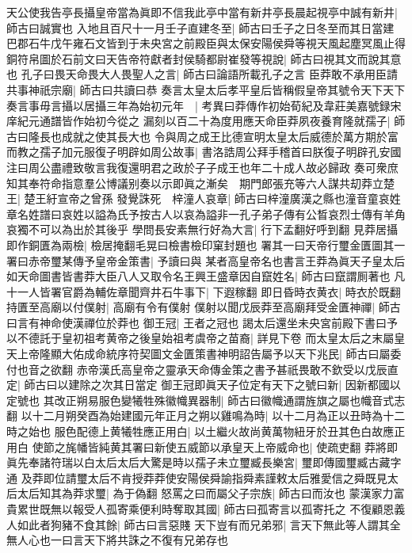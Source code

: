天公使我告亭長攝皇帝當為眞即不信我此亭中當有新井亭長晨起視亭中誠有新井|{
	師古曰誠實也}
入地且百尺十一月壬子直建冬至|{
	師古曰壬子之日冬至而其日當建}
巴郡石牛戊午雍石文皆到于未央宮之前殿臣與太保安陽侯舜等視天風起塵冥風止得銅符帛圖於石前文曰天告帝符獻者封侯騎都尉崔發等視說|{
	師古曰視其文而說其意也}
孔子曰畏天命畏大人畏聖人之言|{
	師古曰論語所載孔子之言}
臣莽敢不承用臣請共事神祇宗廟|{
	師古曰共讀曰恭}
奏言太皇太后孝平皇后皆稱假皇帝其號令天下天下奏言事毋言攝以居攝三年為始初元年　|{
	考異曰莽傳作初始荀紀及韋莊美嘉號録宋庠紀元通譜皆作始初今從之}
漏刻以百二十為度用應天命臣莽夙夜養育隆就孺子|{
	師古曰隆長也成就之使其長大也}
令與周之成王比德宣明太皇太后威德於萬方期於富而教之孺子加元服復子明辟如周公故事|{
	書洛誥周公拜手稽首曰朕復子明辟孔安國注曰周公盡禮致敬言我復還明君之政於子子成王也年二十成人故必歸政}
奏可衆庶知其奉符命指意羣公博議别奏以示即眞之漸矣　期門郎張充等六人謀共刧莽立楚王|{
	楚王紆宣帝之曾孫}
發覺誅死　梓潼人哀章|{
	師古曰梓潼廣漢之縣也潼音童哀姓章名姓譜曰哀姓以謚為氏予按古人以哀為謚非一孔子弟子傳有公晳哀烈士傳有羊角哀獨不可以為出於其後乎}
學問長安素無行好為大言|{
	行下孟翻好呼到翻}
見莽居攝即作銅匱為兩檢|{
	檢居掩翻毛晃曰檢書檢印窠封題也}
署其一曰天帝行璽金匱圖其一署曰赤帝璽某傳予皇帝金策書|{
	予讀曰與}
某者高皇帝名也書言王莽為眞天子皇太后如天命圖書皆書莽大臣八人又取令名王興王盛章因自竄姓名|{
	師古曰竄謂厠著也}
凡十一人皆署官爵為輔佐章聞齊井石牛事下|{
	下遐稼翻}
即日昏時衣黄衣|{
	時衣於既翻}
持匱至高廟以付僕射|{
	高廟有令有僕射}
僕射以聞戊辰莽至高廟拜受金匱神禪|{
	師古曰言有神命使漢禪位於莽也}
御王冠|{
	王者之冠也}
謁太后還坐未央宮前殿下書曰予以不德託于皇初祖考黄帝之後皇始祖考虞帝之苗裔|{
	詳見下卷}
而太皇太后之末屬皇天上帝隆顯大佑成命統序符契圖文金匱策書神明詔告屬予以天下兆民|{
	師古曰屬委付也音之欲翻}
赤帝漢氏高皇帝之靈承天命傳金策之書予甚祇畏敢不欽受以戊辰直定|{
	師古曰以建除之次其日當定}
御王冠即眞天子位定有天下之號曰新|{
	因新都國以定號也}
其改正朔易服色變犧牲殊徽幟異器制|{
	師古曰徽幟通謂旌旗之屬也幟音式志翻}
以十二月朔癸酉為始建國元年正月之朔以雞鳴為時|{
	以十二月為正以丑時為十二時之始也}
服色配德上黄犧牲應正用白|{
	以土繼火故尚黄萬物紐牙於丑其色白故應正用白}
使節之旄幡皆純黄其署曰新使五威節以承皇天上帝威命也|{
	使疏吏翻}
莽將即眞先奉諸符瑞以白太后太后大驚是時以孺子未立璽臧長樂宮|{
	璽即傳國璽臧古藏字通}
及莽即位請璽太后不肯授莽莽使安陽侯舜諭指舜素謹敕太后雅愛信之舜既見太后太后知其為莽求璽|{
	為于偽翻}
怒罵之曰而屬父子宗族|{
	師古曰而汝也}
蒙漢家力富貴累世既無以報受人孤寄乘便利時奪取其國|{
	師古曰孤寄言以孤寄托之}
不復顧恩義人如此者狗豬不食其餘|{
	師古曰言惡賤}
天下豈有而兄弟邪|{
	言天下無此等人謂其全無人心也一曰言天下將共誅之不復有兄弟存也}
